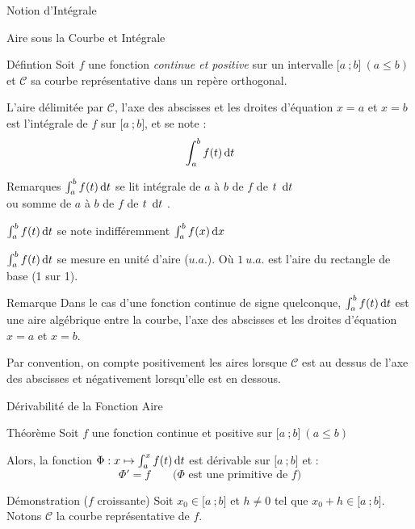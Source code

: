 \documentclass{coursbook}
\begin{document}
    \begin{Gpartie}{Notion d'Intégrale} 
        \begin{Spartie}{Aire sous la Courbe et Intégrale} 
            \begin{SSpartie}{Défintion} 
                Soit $f$ une fonction \emph{continue et positive} sur un intervalle $\big[a~;b\big]~\left(a\leq b\right)$ et $\mathcal{C}$ sa courbe représentative dans un repère orthogonal.

                L'aire délimitée par $\mathcal{C}$, l'axe des abscisses et les droites d'équation $x=a$ et $x=b$ est l'intégrale de $f$ sur $\big[a~;b\big]$, et se note : \[\int_a^b f(t)\,\mathrm{d}t\]
            \end{SSpartie}
            \begin{SSpartie}{Remarques} 
                $\int_a^b f(t)\,\mathrm{d}t$ se lit \og intégrale de $a$ à $b$ de $f$ de $t~\,\mathrm{d}t$ \fg{} \\ ou \og somme de $a$ à $b$ de $f$ de $t~\,\mathrm{d}t$ \fg{}.

                $\int_a^b f(t)\,\mathrm{d}t$ se note indifféremment $\int_a^b f(x)\,\mathrm{d}x$

                $\int_a^b f(t)\,\mathrm{d}t$ se mesure en unité d'aire ($u.a.$). Où $1~u.a.$ est l'aire du rectangle de base (1 sur 1).
            \end{SSpartie}
            \begin{SSpartie}{Remarque} 
                Dans le cas d'une fonction continue de signe quelconque, $\int_a^b f(t)\,\mathrm{d}t$ est une aire algébrique entre la courbe, l'axe des abscisses et les droites d'équation $x=a$ et $x=b$.

                Par convention, on compte positivement les aires lorsque $\mathcal{C}$ est au dessus de l'axe des abscisses et négativement lorsqu'elle est en dessous.
            \end{SSpartie}
        \end{Spartie}
        \begin{Spartie}{Dérivabilité de la Fonction Aire} 
            \begin{SSpartie}{Théorème} 
                Soit $f$ une fonction continue et positive sur $\big[a~;b\big]~\left(a\leq b\right)$

                Alors, la fonction $\Phi:x\mapsto\int_a^xf(t)\,\mathrm{d}t$ est dérivable sur $\big[a~;b\big]$ et : \[\Phi'=f\qquad\text{($\Phi$ est une primitive de $f$)}\]
                \begin{SSSpartie}{Démonstration \big($f$ croissante\big)} 
                    Soit $x_0\in\big[a~;b\big]$ et $h\neq 0$ tel que $x_0+h\in\big[a~;b\big]$. Notons $\mathcal{C}$ la courbe représentative de $f$.


\end{SSSpartie}
\end{SSpartie}
\end{Spartie}
\end{Gpartie}
\end{document}
